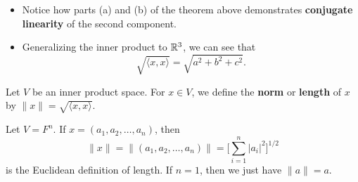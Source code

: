 \begin{itemize}
    \item Notice how parts (a) and (b) of the theorem above demonstrates \textbf{conjugate linearity} of the second component.
    \item Generalizing the inner product to \( \mathbb{R}^{3} \), we can see that 
        \[  \sqrt{ \langle x , x \rangle }  = \sqrt{ a^{2} + b^{2} + c^{2} }. \]
\end{itemize}

\begin{definition}
    Let \( V  \) be an inner product space. For \( x \in V  \), we define the \textbf{norm} or \textbf{length} of \( x  \) by \( \|x\| = \sqrt{\langle x , x \rangle }   \).
\end{definition}

\begin{eg}
    Let \( V = F^{n} \). If \( x = ({a}_{1}, {a}_{2}, \dots, {a}_{n}) \), then 
    \[  \|x\| = \|({a}_{1}, {a}_{2}, \dots, {a}_{n})\| = \Big[ \sum_{ i=1 }^{ n } | {a}_{i} |^{2}\Big]^{1/2}  \]
    is the Euclidean definition of length. If \( n = 1  \), then we just have \( \|a\| = a  \).
\end{eg}

